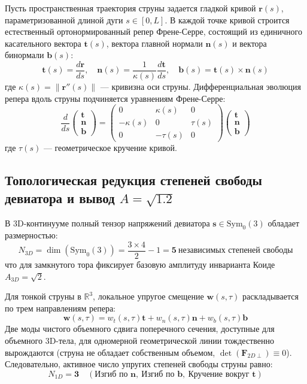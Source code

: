 \documentclass[12pt,a4paper]{article}
\begin{document}
Пусть пространственная траектория струны задается гладкой кривой $\mathbf{r}(s)$, параметризованной длиной дуги $s \in [0, L]$. В каждой точке кривой строится естественный ортонормированный репер Френе-Серре, состоящий из единичного касательного вектора $\mathbf{t}(s)$, вектора главной нормали $\mathbf{n}(s)$ и вектора бинормали $\mathbf{b}(s)$:
\begin{equation}
	\mathbf{t}(s) = \frac{d\mathbf{r}}{ds}, \quad \mathbf{n}(s) = \frac{1}{\kappa(s)} \frac{d\mathbf{t}}{ds}, \quad \mathbf{b}(s) = \mathbf{t}(s) \times \mathbf{n}(s)
\end{equation}
где $\kappa(s) = \|\mathbf{r}''(s)\|$ — кривизна оси струны. Дифференциальная эволюция репера вдоль струны подчиняется уравнениям Френе-Серре:
\begin{equation}
	\frac{d}{ds} \begin{pmatrix} \mathbf{t} \\ \mathbf{n} \\ \mathbf{b} \end{pmatrix} = \begin{pmatrix} 0 & \kappa(s) & 0 \\ -\kappa(s) & 0 & \tau(s) \\ 0 & -\tau(s) & 0 \end{pmatrix} \begin{pmatrix} \mathbf{t} \\ \mathbf{n} \\ \mathbf{b} \end{pmatrix}
\end{equation}
где $\tau(s)$ — геометрическое кручение кривой.

\subsection{Топологическая редукция степеней свободы девиатора и вывод $A = \sqrt{1.2}$}
В 3D-континууме полный тензор напряжений девиатора $\mathbf{s} \in \mathrm{Sym}_0(3)$ обладает размерностью:
\begin{equation}
	N_{3D} = \dim(\mathrm{Sym}_0(3)) = \frac{3 \times 4}{2} - 1 = \mathbf{5} \ \text{независимых степеней свободы}
\end{equation}
что для замкнутого тора фиксирует базовую амплитуду инварианта Коиде $A_{3D} = \sqrt{2}$.

Для тонкой струны в $\mathbb{R}^3$, локальное упругое смещение $\mathbf{w}(s, \tau)$ раскладывается по трем направлениям репера:
\begin{equation}
	\mathbf{w}(s, \tau) = w_t(s, \tau) \mathbf{t} + w_n(s, \tau) \mathbf{n} + w_b(s, \tau) \mathbf{b}
\end{equation}
Две моды чистого объемного сдвига поперечного сечения, доступные для объемного 3D-тела, для одномерной геометрической линии тождественно вырождаются (струна не обладает собственным объемом, $\det(\mathbf{F}_{2D \perp}) \equiv 0$). 
Следовательно, активное число упругих степеней свободы струны равно:
\begin{equation}
	N_{1D} = \mathbf{3} \quad (\text{Изгиб по } \mathbf{n}, \ \text{Изгиб по } \mathbf{b}, \ \text{Кручение вокруг } \mathbf{t})
\end{equation}
\end{document}
